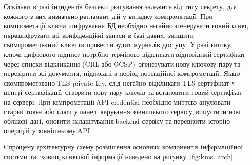 Оскільки в разі інцидентів безпеки реагування залежить від типу секрету, для кожного з них визначено
регламент дій у випадку компрометації. При компрометації ключа шифрування БД необхідно негайно
згенерувати новий ключ, перешифрувати всі конфіденційні записи в базі даних, знищити скомпрометований
ключ та провести аудит журналів доступу. У разі витоку ключа цифрового підпису потрібно терміново
відкликати відповідний сертифікат через списки відкликання (CRL або OCSP), згенерувати нову ключову пару
та перевірити всі документи, підписані в період потенційної компрометації. Якщо скомпрометовано TLS
private key, слід негайно відкликати TLS-сертифікат у центрі сертифікації, створити нову пару ключів та
встановити новий сертифікат на сервері. При компрометації API credential необхідно миттєво анулювати
старий токен або ключ у панелі керування зовнішнього сервісу, випустити нові облікові дані, оновити
налаштування backend-сервісу та перевірити історію операцій у зовнішньому API.

Спрощену архітектурну схему розміщення основних компонентів інформаційної системи та сховищ ключової
інформації наведено на рисунку~\ref{fig:kms_arch}.

